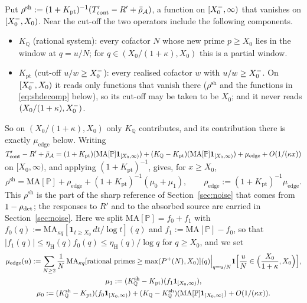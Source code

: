 Put $\rho^{\mathrm{sh}}:=(1+K_{\mathrm{pt}})^{-1}(T'_{\mathrm{cont}}-R'+\bar\rho_{\mathcal{A}})$, a function on $[X_0^{-},\infty)$ that vanishes on
$[X_0^{-},X_0)$. Near the cut-off the two operators include the following components.
\begin{itemize}
\item $K_{\mathbb Q}$ (rational system): every cofactor $N$ whose new prime $p\ge X_0$ lies in the window at $q=u/N$; for
$q\in(X_0/(1+\kappa),X_0)$ this is a partial window.
\item $K_{\mathrm{pt}}$ (cut-off $u/w\ge X_0^{-}$): every realised cofactor $w$ with $u/w\ge X_0^{-}$. On $[X_0^{-},X_0)$ it reads only functions that
vanish there ($\rho^{\mathrm{sh}}$ and the functions in \eqref{eq:shdecomp} below), so its cut-off may be taken to be $X_0$; and it never
reads $(X_0/(1+\kappa),X_0^{-})$.
\end{itemize}
So on $(X_0/(1+\kappa),X_0)$ only $K_{\mathbb Q}$ contributes, and its contribution there is exactly $\mu_{\mathrm{edge}}$ below. Writing
$T'_{\mathrm{cont}}-R'+\bar\rho_{\mathcal{A}}=(1+K_{\mathrm{pt}})(\mathrm{MA}[\mathbb P]\mathbf 1_{[X_0,\infty)})+(K_{\mathbb Q}-K_{\mathrm{pt}})(\mathrm{MA}[\mathbb P]\mathbf 1_{[X_0,\infty)})+\mu_{\mathrm{edge}}+O(1/(\kappa x))$
on $[X_0,\infty)$, and applying $(1+K_{\mathrm{pt}})^{-1}$, gives, for $x\ge X_0$,
\begin{equation}\label{eq:shdecomp}
  \rho^{\mathrm{sh}}=\mathrm{MA}[\mathbb P]+\rho_{\mathrm{edge}}+(1+K_{\mathrm{pt}})^{-1}(\mu_0+\mu_1),\qquad
  \rho_{\mathrm{edge}}:=(1+K_{\mathrm{pt}})^{-1}\mu_{\mathrm{edge}}.
\end{equation}
This $\rho^{\mathrm{sh}}$ is the part of the sharp reference of Section~\ref{sec:noise} that comes from $1-\rho_{\mathrm{det}}$; the responses
to $R'$ and to the absorbed source are carried in Section~\ref{sec:noise}. Here we split
$\mathrm{MA}[\mathbb P]=f_0+f_1$ with $f_0(q):=\mathrm{MA}_{\kappa q}[\mathbf 1_{t\ge X_0}\,dt/\log t](q)$ and $f_1:=\mathrm{MA}[\mathbb P]-f_0$, so
that $|f_1(q)|\le\eta_{\mathrm H}(q)f_0(q)\le\eta_{\mathrm H}(q)/\log q$ for $q\ge X_0$, and we set
\[
\begin{gathered}
  \mu_{\mathrm{edge}}(u):=\sum_{N\ge2}\frac1N\,\mathrm{MA}_{\kappa q}[\text{rational primes}\ge\max(P^+(N),X_0)](q)\Big|_{q=u/N}
  \mathbf 1\Bigl[\frac uN\in\Bigl(\frac{X_0}{1+\kappa},X_0\Bigr)\Bigr],\\
  \mu_1:=(K^{\mathrm{sh}}_{\mathbb Q}-K_{\mathrm{pt}})(f_1\mathbf 1_{[X_0,\infty)}),\\
  \mu_0:=(K^{\mathrm{sh}}_{\mathbb Q}-K_{\mathrm{pt}})(f_0\mathbf 1_{[X_0,\infty)})
  +(K_{\mathbb Q}-K^{\mathrm{sh}}_{\mathbb Q})(\mathrm{MA}[\mathbb P]\mathbf 1_{[X_0,\infty)})+O(1/(\kappa x)).
\end{gathered}
\]
